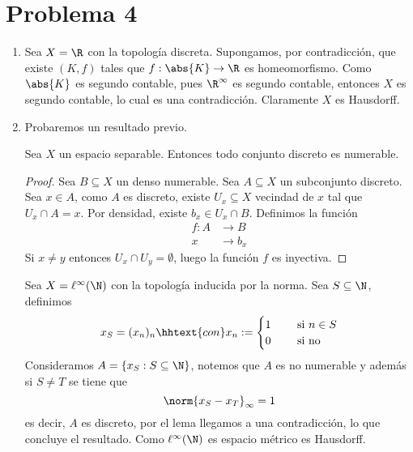 \documentclass{article}
\begin{document}
\section*{Problema 4}
\begin{enumerate}
    \item Sea $X=\R$ con la topología discreta. Supongamos, por contradicción, que existe $(K,f)$
    tales que $f:\abs{K}\to\R$ es homeomorfismo. Como $\abs{K}$ es segundo contable, pues 
    $\R^{\infty}$ es segundo contable, entonces $X$ es segundo contable, lo cual es una 
    contradicción. Claramente $X$ es Hausdorff.

    \item Probaremos un resultado previo.
    \begin{lema}
        Sea $X$ un espacio separable. Entonces todo conjunto discreto es numerable.
    \end{lema}
    \begin{proof}
        Sea $B\subseteq X$ un denso numerable. Sea $A\subseteq X$ un subconjunto discreto. Sea 
        $x\in A$, como $A$ es discreto, existe $U_{x}\subseteq X$ vecindad de $x$ tal que 
        $U_{x}\cap A=x$. Por densidad, existe $b_{x}\in U_{x}\cap B$. Definimos la función
        \begin{align*}
            f:A &\to B \\
            x &\to b_{x}
        \end{align*}
        Si $x\neq y$ entonces $U_{x}\cap U_{y}=\emptyset$, luego la función $f$ es inyectiva.
    \end{proof}

    \noindent Sea $X=\ell^{\infty}(\N)$ con la topología inducida por la norma. Sea 
    $S\subseteq\N$, definimos
    \begin{equation*}
        x_{S}=(x_{n})_{n}\hhtext{con}x_{n}:=\begin{cases}
            1 &\quad\text{ si }n\in S \\
            0 &\quad\text{ si no}
        \end{cases}
    \end{equation*}
    Consideramos $A=\{x_{S}:S\subseteq\N\}$, notemos que $A$ es no numerable y además si $S\neq T$ 
    se tiene que
    \begin{equation*}
        \norm{x_{S}-x_{T}}_{\infty}=1
    \end{equation*}
    es decir, $A$ es discreto, por el lema llegamos a una contradicción, lo que concluye el 
    resultado. Como $\ell^{\infty}(\N)$ es espacio métrico es Hausdorff.


\end{enumerate}
\end{document}
